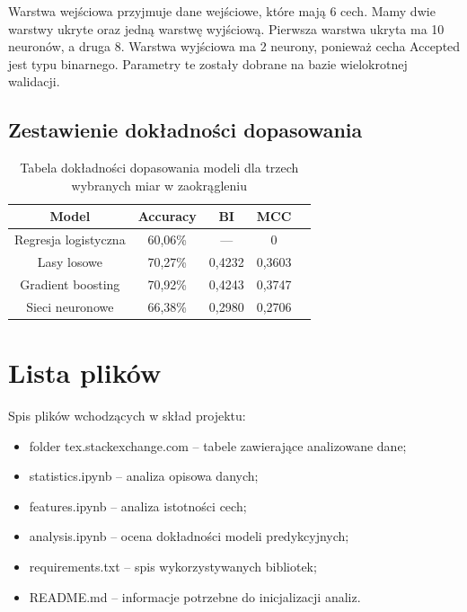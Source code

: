 \documentclass[12pt]{article}
\begin{document}
	\vspace{0.25cm}
	
	Warstwa wejściowa przyjmuje dane wejściowe, które mają 6 cech. Mamy dwie warstwy ukryte oraz jedną warstwę wyjściową. Pierwsza warstwa ukryta ma 10 neuronów, a druga 8. Warstwa wyjściowa ma 2 neurony, ponieważ cecha Accepted jest typu binarnego. Parametry te zostały dobrane na bazie wielokrotnej walidacji.
	
	\subsection{Zestawienie dokładności dopasowania}\label{subsec:zestawienie-dopasowania-modeli}
	
	\begin{table}[H]
		\centering
		\begin{tabular}{c|cccc}
			\hline\hline
			       Model         & Accuracy &   BI   &  MCC   &  \\\hline
			Regresja logistyczna & 60,06\% &   ---  &   0    &  \\
			    Lasy losowe      & 70,27\% & 0,4232 & 0,3603 &  \\
			 Gradient boosting   & 70,92\% & 0,4243 & 0,3747 &  \\
			  Sieci neuronowe    & 66,38\% & 0,2980 & 0,2706 &  \\\hline
		\end{tabular}
		\caption{Tabela dokładności dopasowania modeli dla trzech wybranych miar w zaokrągleniu}
		\label{tab:dokladnosc}
	\end{table}
	
	\section{Lista plików}\label{sec:lista-plikow}
	Spis plików wchodzących w skład projektu:
	\begin{itemize}
		\item folder tex.stackexchange.com -- tabele zawierające analizowane dane;
		\item statistics.ipynb -- analiza opisowa danych;
		\item features.ipynb -- analiza istotności cech;
		\item analysis.ipynb -- ocena dokładności modeli predykcyjnych;
		\item requirements.txt -- spis wykorzystywanych bibliotek;
		\item README.md -- informacje potrzebne do inicjalizacji analiz.
	\end{itemize}
	
\end{document}
